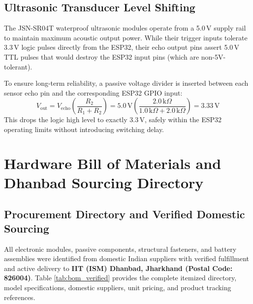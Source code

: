\section{Ultrasonic Transducer Level Shifting}
The JSN-SR04T waterproof ultrasonic modules operate from a 5.0\,V supply rail to maintain maximum acoustic output power. While their trigger inputs tolerate 3.3\,V logic pulses directly from the ESP32, their echo output pins assert 5.0\,V TTL pulses that would destroy the ESP32 input pins (which are non-5V-tolerant). 

To ensure long-term reliability, a passive voltage divider is inserted between each sensor echo pin and the corresponding ESP32 GPIO input:
\begin{equation}
V_{\text{out}} = V_{\text{echo}} \left(\frac{R_2}{R_1 + R_2}\right) = 5.0\,\text{V} \left(\frac{2.0\,\text{k}\Omega}{1.0\,\text{k}\Omega + 2.0\,\text{k}\Omega}\right) = 3.33\,\text{V}
\end{equation}
This drops the logic high level to exactly 3.3\,V, safely within the ESP32 operating limits without introducing switching delay.

\clearpage
\chapter{Hardware Bill of Materials and Dhanbad Sourcing Directory}
\label{app:bom}

\section{Procurement Directory and Verified Domestic Sourcing}
All electronic modules, passive components, structural fasteners, and battery assemblies were identified from domestic Indian suppliers with verified fulfillment and active delivery to \textbf{IIT (ISM) Dhanbad, Jharkhand (Postal Code: 826004)}. Table \ref{tab:bom_verified} provides the complete itemized directory, model specifications, domestic suppliers, unit pricing, and product tracking references.

